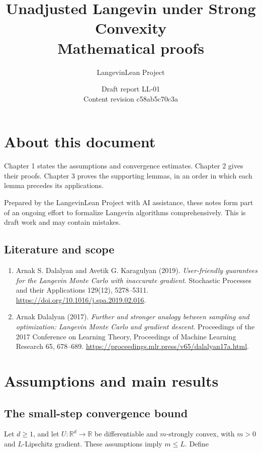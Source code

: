 \documentclass[11pt,a4paper]{report}
\title{\texorpdfstring{Unadjusted Langevin under Strong Convexity}{Unadjusted Langevin under Strong Convexity}\\[0.6em]\large Mathematical proofs}
\author{LangevinLean Project}
\date{Draft report LL-01\\[0.4em]\small Content revision c58ab5c70c3a}
\begin{document}
\maketitle
\chapter*{About this document}
Chapter 1 states the assumptions and convergence estimates. Chapter 2 gives their proofs. Chapter 3 proves the supporting lemmas, in an order in which each lemma precedes its applications.

Prepared by the LangevinLean Project with AI assistance, these notes form part of an ongoing effort to formalize Langevin algorithms comprehensively. This is draft work and may contain mistakes.

\section*{Literature and scope}
\begin{enumerate}
\item Arnak S. Dalalyan and Avetik G. Karagulyan (2019). \emph{User-friendly guarantees for the Langevin Monte Carlo with inaccurate gradient}. Stochastic Processes and their Applications 129(12), 5278–5311. \url{https://doi.org/10.1016/j.spa.2019.02.016}.
\item Arnak Dalalyan (2017). \emph{Further and stronger analogy between sampling and optimization: Langevin Monte Carlo and gradient descent}. Proceedings of the 2017 Conference on Learning Theory, Proceedings of Machine Learning Research 65, 678–689. \url{https://proceedings.mlr.press/v65/dalalyan17a.html}.
\end{enumerate}
\tableofcontents
\clearpage
{}
\chapter{Assumptions and main results}
\section{\texorpdfstring{The small-step convergence bound}{The small-step convergence bound}}


Let \(d\ge1\), and let \(U:\mathbb R^d\to\mathbb R\) be differentiable and \(m\)-strongly convex, with \(m>0\) and \(L\)-Lipschitz gradient. These assumptions imply \(m\le L\). Define
\end{document}

